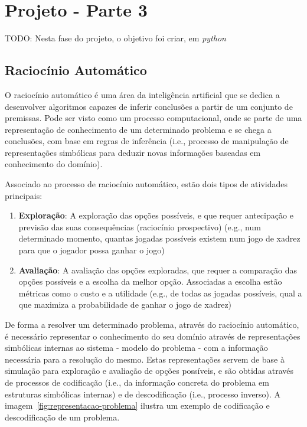 \chapter{Projeto - Parte 3}\label{ch:projeto-parte3}

TODO: Nesta fase do projeto, o objetivo foi criar, em \textit{python}


\section{Raciocínio Automático}\label{sec:raciocinio-automatico}

O raciocínio automático é uma área da inteligência artificial que se dedica a desenvolver algoritmos capazes de inferir conclusões a partir de um conjunto de premissas.
Pode ser visto como um processo computacional, onde se parte de uma representação de conhecimento de um determinado problema e se chega a conclusões, com base em regras de inferência (i.e., processo de manipulação de representações simbólicas para deduzir novas informações baseadas em conhecimento do domínio).

Associado ao processo de raciocínio automático, estão dois tipos de atividades principais:

\begin{enumerate}
    \item \textbf{Exploração}: A exploração das opções possíveis, e que requer antecipação e previsão das suas consequências (raciocínio prospectivo) (e.g., num determinado momento, quantas jogadas possíveis existem num jogo de xadrez para que o jogador possa ganhar o jogo)
    \item \textbf{Avaliação}: A avaliação das opções exploradas, que requer a comparação das opções possíveis e a escolha da melhor opção.
    Associadas a escolha estão métricas como o custo e a utilidade (e.g., de todas as jogadas possíveis, qual a que maximiza a probabilidade de ganhar o jogo de xadrez)
\end{enumerate}

De forma a resolver um determinado problema, através do raciocínio automático, é necessário representar o conhecimento do seu domínio através de representações simbólicas internas ao sistema - modelo do problema - com a informação necessária para a resolução do mesmo.
Estas representações servem de base à simulação para exploração e avaliação de opções possíveis, e são obtidas através de processos de codificação (i.e., da informação concreta do problema em estruturas simbólicas internas) e de descodificação (i.e., processo inverso).
A imagem~\ref{fig:representacao-problema} ilustra um exemplo de codificação e descodificação de um problema.

